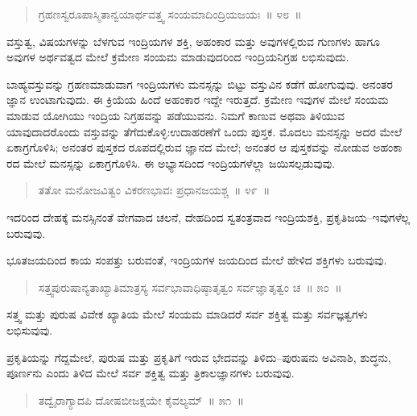 \begin{verse}
ಗ್ರಹಣಸ್ವರೂಪಾಸ್ಮಿತಾನ್ವಯಾರ್ಥವತ್ತ್ವ ಸಂಯಮಾದಿಂದ್ರಿಯಜಯಃ~॥ ೪೮~॥
\end{verse}

\vspace{-0.3cm}

ವಸ್ತುತ್ವ, ವಿಷಯಗಳನ್ನು ಬೆಳಗುವ ಇಂದ್ರಿಯಗಳ ಶಕ್ತಿ, ಅಹಂಕಾರ ಮತ್ತು ಅವುಗಳಲ್ಲಿರುವ ಗುಣಗಳು ಹಾಗೂ ಅವುಗಳ ಅರ್ಥವತ್ವದ ಮೇಲೆ ಕ್ರಮೇಣ ಸಂಯಮ ಮಾಡುವುದರಿಂದ ಇಂದ್ರಿಯನಿಗ್ರಹ ಲಭಿಸುವುದು. 

ಬಾಹ್ಯವಸ್ತುವನ್ನು ಗ್ರಹಣಮಾಡುವಾಗ ಇಂದ್ರಿಯಗಳು ಮನಸ್ಸನ್ನು ಬಿಟ್ಟು ವಸ್ತುವಿನ ಕಡೆಗೆ ಹೋಗುವುವು. ಅನಂತರ ಜ್ಞಾನ ಉಂಟಾಗುವುದು. ಈ ಕ್ರಿಯೆಯ ಹಿಂದೆ ಅಹಂಕಾರ ಇದ್ದೇ ಇರುತ್ತದೆ. ಕ್ರಮೇಣ ಇವುಗಳ ಮೇಲೆ ಸಂಯಮ ಮಾಡುವ ಯೋಗಿಯು ಇಂದ್ರಿಯ ನಿಗ್ರಹವನ್ನು ಪಡೆಯುವನು. ನಿಮಗೆ ಕಾಣುವ ಅಥವಾ ತಿಳಿಯುವ ಯಾವುದಾದರೊಂದು ವಸ್ತುವನ್ನು ತೆಗೆದುಕೊಳ್ಳಿ:ಉದಾಹರಣೆಗೆ ಒಂದು ಪುಸ್ತಕ. ಮೊದಲು ಮನಸ್ಸನ್ನು ಅದರ ಮೇಲೆ ಏಕಾಗ್ರಗೊಳಿಸಿ; ಅನಂತರ ಪುಸ್ತಕದ ರೂಪದಲ್ಲಿರುವ ಜ್ಞಾನದ ಮೇಲೆ; ಅನಂತರ ಆ ಪುಸ್ತಕವನ್ನು ನೋಡುವ ಅಹಂಕಾ ರದ ಮೇಲೆ ಮನಸ್ಸನ್ನು ಏಕಾಗ್ರಗೊಳಿಸಿ. ಈ ಅಭ್ಯಾಸದಿಂದ ಇಂದ್ರಿಯಗಳೆಲ್ಲಾ ಜಯಿಸಲ್ಪಡುವುವು. 

\vspace{-0.3cm}

\begin{verse}
ತತೋ ಮನೋಜವಿತ್ವಂ ವಿಕರಣಭಾವಃ ಪ್ರಧಾನಜಯಶ್ಚ~॥ ೪೯~॥
\end{verse}

\vspace{-0.3cm}

ಇದರಿಂದ ದೇಹಕ್ಕೆ ಮನಸ್ಸಿನಂತೆ ವೇಗವಾದ ಚಲನೆ, ದೇಹದಿಂದ ಸ್ವತಂತ್ರವಾದ ಇಂದ್ರಿಯಶಕ್ತಿ, ಪ್ರಕೃತಿಜಯ–ಇವುಗಳೆಲ್ಲ ಬರುವುವು. 

ಭೂತಜಯದಿಂದ ಕಾಯ ಸಂಪತ್ತು ಬರುವಂತೆ, ಇಂದ್ರಿಯಗಳ ಜಯದಿಂದ ಮೇಲೆ ಹೇಳಿದ ಶಕ್ತಿಗಳು ಬರುವುವು. 

\vspace{-0.3cm}

\begin{verse}
ಸತ್ತ್ವಪುರುಷಾನ್ಯತಾಖ್ಯಾತಿಮಾತ್ರಸ್ಯ ಸರ್ವಭಾವಾಧಿಷ್ಠಾತೃತ್ವಂ ಸರ್ವಜ್ಞಾತೃತ್ವಂ ಚ~॥ ೫೦~॥
\end{verse}

\vspace{-0.3cm}

ಸತ್ತ್ವ ಮತ್ತು ಪುರುಷ ವಿವೇಕ ಖ್ಯಾತಿಯ ಮೇಲೆ ಸಂಯಮ ಮಾಡಿದರೆ ಸರ್ವ ಶಕ್ತಿತ್ವ ಮತ್ತು ಸರ್ವಜ್ಞತ್ವಗಳು ಲಭಿಸುವುವು. 

ಪ್ರಕೃತಿಯನ್ನು ಗೆದ್ದಮೇಲೆ, ಪುರುಷ ಮತ್ತು ಪ್ರಕೃತಿಗೆ ಇರುವ ಭೇದವನ್ನು ತಿಳಿದು–ಪುರುಷನು ಅವಿನಾಶಿ, ಶುದ್ಧನು, ಪೂರ್ಣನು ಎಂದು ತಿಳಿದ ಮೇಲೆ ಸರ್ವ ಶಕ್ತಿತ್ವ ಮತ್ತು ತ್ರಿಕಾಲಜ್ಞಾನಗಳು ಬರುವುವು. 

\vspace{-0.3cm}

\begin{verse}
ತದ್ವೈರಾಗ್ಯಾದಪಿ ದೋಷಬೀಜಕ್ಷಯೇ ಕೈವಲ್ಯಮ್​~॥ ೫೧~॥
\end{verse}

